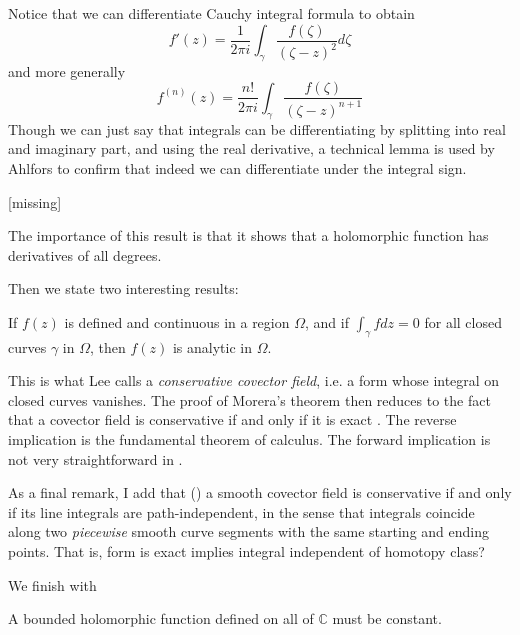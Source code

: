 Notice that we can differentiate Cauchy integral formula to obtain
\begin{equation}
\label{equation-first-derivative-Cauchy-formula}
f'(z)=\frac{1}{2\pi i}\int_\gamma\frac{f(\zeta)}{(\zeta-z)^2}d\zeta
\end{equation}
and more generally
$$
f^{(n)}(z)=\frac{n!}{2\pi i}\int_\gamma \frac{f(\zeta)}{(\zeta-z)^{n+1}}
$$
Though we can just say that integrals can be differentiating by splitting into
real and imaginary part, and using the real derivative, a technical lemma is 
used by Ahlfors to confirm that indeed we can differentiate
under the integral sign.

\begin{lemma}
\label{lemma-technical-lemma}
[missing]
\end{lemma}

The importance of this result is that it shows that a holomorphic function has
derivatives of all degrees.

Then we state two interesting results:

\begin{theorem}[Morera]
\label{theorem-Morera}
\begin{reference}
\cite[p. 122]{ahl}
\end{reference}
If $f(z)$ is defined and continuous in a region $\Omega$, and if 
$\int_\gamma fdz=0$ for all closed curves $\gamma$ in $\Omega$, then $f(z)$ is
analytic in $\Omega$.
\end{theorem}

This is what Lee calls a {\it conservative covector field}, i.e. a form whose
integral on closed curves vanishes. The proof of Morera's theorem then reduces
to the fact that a covector field is conservative if and only if it is exact
\cite[Theorem 11.42]{les}. The reverse implication is the fundamental theorem of
calculus. The forward implication is not very straightforward in \cite{les}.

As a final remark, I add that (\cite[Propoistion 11.40]{les}) a smooth covector
field is conservative if and only if its line integrals are path-independent, in
the sense that integrals coincide along two {\it piecewise} smooth curve
segments with the same starting and ending points. That is, form is exact
implies integral independent of homotopy class?

We finish with

\begin{theorem}[Liouville]
\label{theorem-Liouville}
A bounded holomorphic function defined on all of $\mathbb{C}$ must be constant.
\end{theorem}


